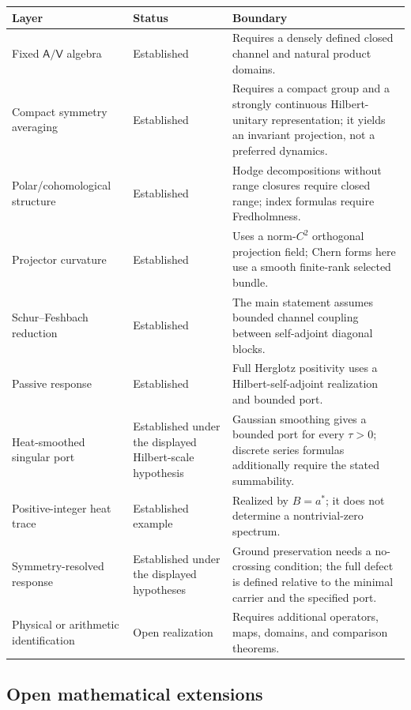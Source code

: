\documentclass[11pt,reqno]{scrartcl}
\newcommand{\Aop}{\mathsf A}
\newcommand{\Vop}{\mathsf V}
\theoremstyle{plain}
\theoremstyle{definition}
\theoremstyle{remark}
\begin{document}
\begin{center}
\small
\begin{tabularx}{\textwidth}{>{\raggedright\arraybackslash}p{} >{\raggedright\arraybackslash}p{} X}
\toprule
\textbf{Layer} & \textbf{Status} & \textbf{Boundary} \\
\midrule
Fixed \(\Aop/\Vop\) algebra & Established & Requires a densely defined closed channel and natural product domains. \\
Compact symmetry averaging & Established & Requires a compact group and a strongly continuous Hilbert-unitary representation; it yields an invariant projection, not a preferred dynamics. \\
Polar/cohomological structure & Established & Hodge decompositions without range closures require closed range; index formulas require Fredholmness. \\
Projector curvature & Established & Uses a norm-\(C^2\) orthogonal projection field; Chern forms here use a smooth finite-rank selected bundle. \\
Schur--Feshbach reduction & Established & The main statement assumes bounded channel coupling between self-adjoint diagonal blocks. \\
Passive response & Established & Full Herglotz positivity uses a Hilbert-self-adjoint realization and bounded port. \\
Heat-smoothed singular port & Established under the displayed Hilbert-scale hypothesis & Gaussian smoothing gives a bounded port for every \(\tau>0\); discrete series formulas additionally require the stated summability. \\
Positive-integer heat trace & Established example & Realized by \(B=a^*\); it does not determine a nontrivial-zero spectrum. \\
Symmetry-resolved response & Established under the displayed hypotheses & Ground preservation needs a no-crossing condition; the full defect is defined relative to the minimal carrier and the specified port. \\
Physical or arithmetic identification & Open realization & Requires additional operators, maps, domains, and comparison theorems. \\
\bottomrule
\end{tabularx}
\end{center}

\subsection{Open mathematical extensions}
\end{document}
